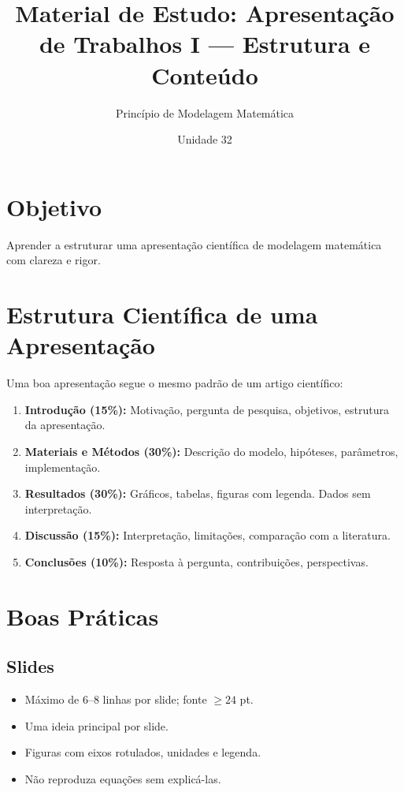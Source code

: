 \documentclass[12pt,a4paper]{article}
\title{Material de Estudo: Apresenta\c{c}\~ao de Trabalhos I --- Estrutura e Conte\'udo}
\author{Princ\'ipio de Modelagem Matem\'atica}
\date{Unidade 32}
\begin{document}
\maketitle

\section*{Objetivo}
Aprender a estruturar uma apresenta\c{c}\~ao cient\'ifica de modelagem matem\'atica com clareza e rigor.

\section*{Estrutura Cient\'ifica de uma Apresenta\c{c}\~ao}

Uma boa apresenta\c{c}\~ao segue o mesmo padr\~ao de um artigo cient\'ifico:

\begin{enumerate}
  \item \textbf{Introdu\c{c}\~ao (15\%):} Motiva\c{c}\~ao, pergunta de pesquisa, objetivos, estrutura da apresenta\c{c}\~ao.
  \item \textbf{Materiais e M\'etodos (30\%):} Descri\c{c}\~ao do modelo, hip\'oteses, par\^ametros, implementa\c{c}\~ao.
  \item \textbf{Resultados (30\%):} Gr\'aficos, tabelas, figuras com legenda. Dados sem interpreta\c{c}\~ao.
  \item \textbf{Discuss\~ao (15\%):} Interpreta\c{c}\~ao, limita\c{c}\~oes, compara\c{c}\~ao com a literatura.
  \item \textbf{Conclus\~oes (10\%):} Resposta \`a pergunta, contribui\c{c}\~oes, perspectivas.
\end{enumerate}

\section*{Boas Pr\'aticas}

\subsection*{Slides}
\begin{itemize}
  \item M\'aximo de 6--8 linhas por slide; fonte $\ge 24$ pt.
  \item Uma ideia principal por slide.
  \item Figuras com eixos rotulados, unidades e legenda.
  \item N\~ao reproduza equa\c{c}\~oes sem explic\'a-las.
\end{itemize}
\end{document}
